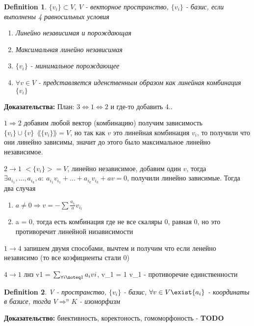 \documentclass[12pt]{article}
\newtheorem{definition}{Definition}
\begin{document}
\begin{definition}
    $\{v_i\} \subset V$, $V$ - векторное пространство, $\{v_i\}$ - базис, если выполнены 4 равносильных условия
    \begin{enumerate}
        \item Линейно независимая и порождающая
        \item Максимальная линейно независимая
        \item $\{v_i\}$ - минимальное порождающее
        \item $\forall v \in V$ - представляется иденственным образом как линейная комбинация $\{v_i\}$ 
    \end{enumerate}

\end{definition} 

\textbf{Доказательства:} План: $3 \Leftrightarrow 1 \Leftrightarrow 2$ и где-то добавить 4..

$1 \Rightarrow 2$ добавим любой вектор (комбинацию) получим зависимость $\{v_i\}\cup\{v\}\ \ \lang\{v_i\}\rang =V$, но так как $v$ это линейная комбинация ${v_i}$, то получили что они линейно зависимы, значит до этого было максимальное линейно независимое.

$2 \rightarrow 1$ $<\{v_i\}> = V$, линейно независимое, добавим один $v$, тогда $\exists a_{i_1},...,a_{i_k},a:\ a_{i_1}v_{i_1}+...+a_{i_k}v_{i_k}+av=0$, получили линейно зависимые. Тогда два случая \begin{enumerate}
    \item $a\neq 0\Rightarrow v=-\sum \frac{a_{i_l}}{a}v_{i_l}$
    \item a = 0, тогда есть комбинация где не все скаляры 0, равная 0, но это противоречит линейной низависимости 
\end{enumerate}

$1 \rightarrow 4$ запишем двумя способами, вычтем и получим  что если ленейно независимо (то все коэфициенты стали 0)

$4 \rightarrow 1$ лнз v1 = $\sum_{\forall i \noteq 1} {a_ivi}$, v_1 = 1 v_1 - противоречие единственности 


\begin{definition}
    V - пространство, $\{v_i\}$ - базис, $\forall v \in V \exist {a_i}$ - координаты в базисе, тогда $V \Rightarrow ^nK$ - изоморфизм
\end{definition} 
\textbf{Доказательство:} биективность, коректоность, гомоморфоность - \textbf{TODO}
\\
\end{document}
